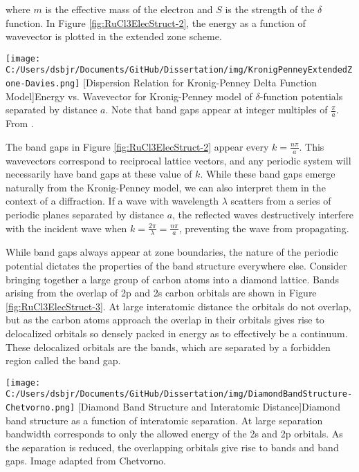 where $m$ is the effective mass of the electron and $S$ is the strength of the $\delta$ function. In Figure \ref{fig:RuCl3ElecStruct-2}, the energy as a function of wavevector is plotted in the extended zone scheme.

\begin{centering}
\texttt{[image: C:/Users/dsbjr/Documents/GitHub/Dissertation/img/KronigPenneyExtendedZone-Davies.png]}
  \captionsetup{width=0.75\textwidth}
  [Dispersion Relation for Kronig-Penney Delta Function Model]{Energy vs. Wavevector for Kronig-Penney model of $\delta$-function potentials separated by distance $a$. Note that band gaps appear at integer multiples of $\frac{\pi}{a}$. From \cite{Davies1997}.} 
  \label{fig:RuCl3ElecStruct-2}
\end{centering}

The band gaps in Figure \ref{fig:RuCl3ElecStruct-2} appear every $k = \frac{n\pi}{a}$. This wavevectors correspond to reciprocal lattice vectors, and any periodic system will necessarily have band gaps at these value of $k$. While these band gaps emerge naturally from the Kronig-Penney model, we can also interpret them in the context of a diffraction. If a wave with wavelength $\lambda$ scatters from a series of periodic planes separated by distance $a$, the reflected waves destructively interfere with the incident wave when $k = \frac{2\pi}{\lambda} = \frac{n \pi}{a}$, preventing the wave from propagating.

While band gaps always appear at zone boundaries, the nature of the periodic potential dictates the properties of the band structure everywhere else. Consider bringing together a large group of carbon atoms into a diamond lattice. Bands arising from the overlap of 2p and 2s carbon orbitals are shown in Figure \ref{fig:RuCl3ElecStruct-3}.  At large interatomic distance the orbitals do not overlap, but as the carbon atoms approach the overlap in their orbitals gives rise to delocalized orbitals so densely packed in energy as to effectively be a continuum. These delocalized orbitals are the bands, which are separated by a forbidden region called the band gap.

\begin{centering}
\texttt{[image: C:/Users/dsbjr/Documents/GitHub/Dissertation/img/DiamondBandStructure-Chetvorno.png]}
  \captionsetup{width=0.75\textwidth}
  [Diamond Band Structure and Interatomic Distance]{Diamond band structure as a function of interatomic separation. At large separation bandwidth corresponds to only the allowed energy of the 2s and 2p orbitals. As the separation is reduced, the overlapping orbitals give rise to bands and band gaps. Image adapted from Chetvorno.} 
  \label{fig:RuCl3ElecStruct-3}
\end{centering}

